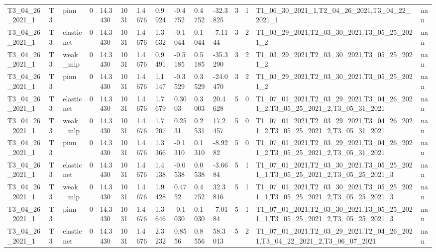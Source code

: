 \begin{table}[t]
\begin{tabular}{lllllllllllllll}
T3\_04\_26\_2021\_1 & T3 & pinn & 0 & 14.3430 & 1031 & 1.4676 & 0.9924 & -0.4752 & 0.4752 & -32.3825 & 3 & 1 & T1\_06\_30\_2021\_1,T2\_04\_26\_2021,T3\_04\_22\_2021\_1 & nan \\
T3\_04\_26\_2021\_1 & T3 & elasticnet & 0 & 14.3430 & 1031 & 1.4676 & 1.3632 & -0.1044 & 0.1044 & -7.1144 & 3 & 2 & T1\_03\_29\_2021,T2\_03\_30\_2021,T3\_05\_25\_2021\_2 & nan \\
T3\_04\_26\_2021\_1 & T3 & weak\_mlp & 0 & 14.3430 & 1031 & 1.4676 & 0.9491 & -0.5185 & 0.5185 & -35.3290 & 3 & 2 & T1\_03\_29\_2021,T2\_03\_30\_2021,T3\_05\_25\_2021\_2 & nan \\
T3\_04\_26\_2021\_1 & T3 & pinn & 0 & 14.3430 & 1031 & 1.4676 & 1.1147 & -0.3529 & 0.3529 & -24.0470 & 3 & 2 & T1\_03\_29\_2021,T2\_03\_30\_2021,T3\_05\_25\_2021\_2 & nan \\
T3\_04\_26\_2021\_1 & T3 & elasticnet & 0 & 14.3430 & 1031 & 1.4676 & 1.7679 & 0.3003 & 0.3003 & 20.4628 & 5 & 0 & T1\_07\_01\_2021,T2\_03\_29\_2021,T3\_04\_26\_2021\_2,T3\_05\_25\_2021\_2,T3\_05\_31\_2021 & nan \\
T3\_04\_26\_2021\_1 & T3 & weak\_mlp & 0 & 14.3430 & 1031 & 1.4676 & 1.7207 & 0.2531 & 0.2531 & 17.2457 & 5 & 0 & T1\_07\_01\_2021,T2\_03\_29\_2021,T3\_04\_26\_2021\_2,T3\_05\_25\_2021\_2,T3\_05\_31\_2021 & nan \\
T3\_04\_26\_2021\_1 & T3 & pinn & 0 & 14.3430 & 1031 & 1.4676 & 1.3366 & -0.1310 & 0.1310 & -8.9282 & 5 & 0 & T1\_07\_01\_2021,T2\_03\_29\_2021,T3\_04\_26\_2021\_2,T3\_05\_25\_2021\_2,T3\_05\_31\_2021 & nan \\
T3\_04\_26\_2021\_1 & T3 & elasticnet & 0 & 14.3430 & 1031 & 1.4676 & 1.4138 & -0.0538 & 0.0538 & -3.6684 & 5 & 1 & T1\_07\_01\_2021,T2\_03\_30\_2021,T3\_05\_25\_2021\_1,T3\_05\_25\_2021\_2,T3\_05\_25\_2021\_3 & nan \\
T3\_04\_26\_2021\_1 & T3 & weak\_mlp & 0 & 14.3430 & 1031 & 1.4676 & 1.9428 & 0.4752 & 0.4752 & 32.3816 & 5 & 1 & T1\_07\_01\_2021,T2\_03\_30\_2021,T3\_05\_25\_2021\_1,T3\_05\_25\_2021\_2,T3\_05\_25\_2021\_3 & nan \\
T3\_04\_26\_2021\_1 & T3 & pinn & 0 & 14.3430 & 1031 & 1.4676 & 1.3646 & -0.1030 & 0.1030 & -7.0184 & 5 & 1 & T1\_07\_01\_2021,T2\_03\_30\_2021,T3\_05\_25\_2021\_1,T3\_05\_25\_2021\_2,T3\_05\_25\_2021\_3 & nan \\
T3\_04\_26\_2021\_1 & T3 & elasticnet & 0 & 14.3430 & 1031 & 1.4676 & 2.3232 & 0.8556 & 0.8556 & 58.3013 & 5 & 2 & T1\_07\_01\_2021,T2\_03\_29\_2021,T2\_04\_26\_2021,T3\_04\_22\_2021\_2,T3\_06\_07\_2021 & nan \\

\end{tabular}
\end{table}
